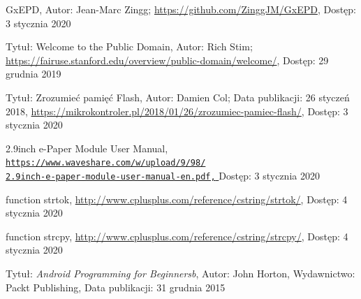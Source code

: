 \documentclass[a4paper,12pt, twoside]{article}
\begin{document}
\begin{thebibliography}{}
    		GxEPD,\newline
    		Autor: Jean-Marc Zingg;
    		\newline\url{https://github.com/ZinggJM/GxEPD}, 
    		\newline Dostęp: 3 stycznia 2020
    		
    		Tytuł: Welcome to the Public Domain, \newline
    		Autor: Rich Stim; \newline
    		\newline\url{https://fairuse.stanford.edu/overview/public-domain/welcome/}, 
    		\newline Dostęp: 29 grudnia 2019
    		
    		Tytuł: Zrozumieć pamięć Flash,\newline
    		Autor: Damien Col; \newline
    		Data publikacji: 26 styczeń 2018,
    		\newline\url{https://mikrokontroler.pl/2018/01/26/zrozumiec-pamiec-flash/}, 
    		\newline Dostęp: 3 stycznia 2020
    		
    		2.9inch e-Paper Module User Manual,
    		\newline\href{https://www.waveshare.com/w/upload/9/98/2.9inch-e-paper-module-user-manual-en.pdf}
    		 {\nolinkurl{https://www.waveshare.com/w/upload/9/98/}
                 \\
                  \nolinkurl{2.9inch-e-paper-module-user-manual-en.pdf,}
                 }
    		\newline Dostęp: 3 stycznia 2020
    		
    		function strtok,
    		\newline\url{http://www.cplusplus.com/reference/cstring/strtok/}, 
    		\newline Dostęp: 4 stycznia 2020
    		
    		function strcpy,
    		\newline\url{http://www.cplusplus.com/reference/cstring/strcpy/}, 
    		\newline Dostęp: 4 stycznia 2020
    		
    		Tytuł: \textit{Android Programming for Beginnersb}, \newline
    	    Autor: John Horton, \newline
    	    Wydawnictwo: Packt Publishing,
    		\newline Data publikacji: 31 grudnia 2015
    		

\end{thebibliography}
\end{document}
